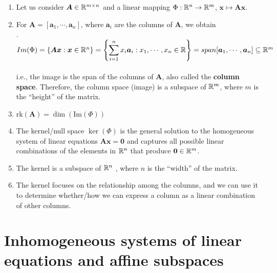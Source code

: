 \begin{enumerate}
    \item Let us consider $\bm{A} \in \mathbb{R}^{m\times n}$ and a linear mapping $\Phi : \mathbb{R}^n \to \mathbb{R}^m$, $\bm{x} \mapsto \bm{Ax}$.
    \hfill \cite{mfml/book/mml/Deisenroth-Faisal-Ong}

    \item For $\bm{A} = [\bm{a}_1, \cdots , \bm{a}_n]$, where $\bm{a}_i$ are the columns of $\bm{A}$, we obtain
    \hfill \cite{mfml/book/mml/Deisenroth-Faisal-Ong}
    \\
    .\hfill
    $
        Im(\Phi)
        = \left\{\bm{Ax} : \bm{x} \in \mathbb{R}^ n \right\}
        = \left\{\displaystyle\sum ^n _{i=1} x_i \bm{a}_i : x_1, \cdots , x_n \in \mathbb{R}\right\}
        = span[\bm{a}_1, \cdots , \bm{a}_n] \subseteq \mathbb{R}^m
    $
    \hfill \cite{mfml/book/mml/Deisenroth-Faisal-Ong}
    \\
    i.e., the image is the span of the columns of $\bm{A}$, also called the \textbf{column space}.
    Therefore, the column space (image) is a subspace of $\mathbb{R}^m$, where $m$ is the “height” of the matrix.
    \hfill \cite{mfml/book/mml/Deisenroth-Faisal-Ong}

    \item $\text{rk}(\bm{A}) = \dim(\text{Im}(\Phi))$
    \hfill \cite{mfml/book/mml/Deisenroth-Faisal-Ong}

    \item The kernel/null space $\ker(\Phi)$ is the general solution to the homogeneous system of linear equations $\bm{Ax} = \bm{0}$ and captures all possible linear combinations of the elements in $\mathbb{R}^n$ that produce $\bm{0} \in \mathbb{R}^m$.
    \hfill \cite{mfml/book/mml/Deisenroth-Faisal-Ong}

    \item The kernel is a subspace of $\mathbb{R}^n$ , where $n$ is the “width” of the matrix.
    \hfill \cite{mfml/book/mml/Deisenroth-Faisal-Ong}

    \item The kernel focuses on the relationship among the columns, and we can use it to determine whether/how we can express a column as a linear combination of other columns.
    \hfill \cite{mfml/book/mml/Deisenroth-Faisal-Ong}
\end{enumerate}






\section{Inhomogeneous systems of linear equations and affine subspaces}

